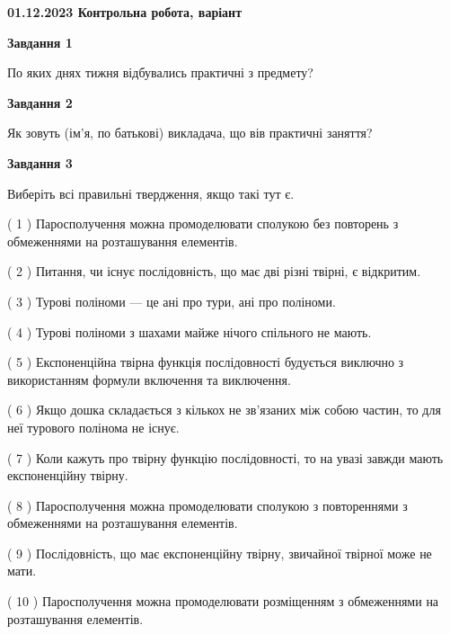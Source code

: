 \documentclass[12pt, ukrainian]{article}
\begin{document}
\begin {large}

\textbf{01.12.2023 Контрольна робота, варіант  }\par


{
{\begin {center}\textbf{Завдання 1}\end {center}}\par
По яких днях тижня відбувались практичні з предмету?\par
{\begin {center}\textbf{Завдання 2}\end {center}}\par
Як зовуть (ім'я, по батькові) викладача, що вів практичні заняття?\par
{\begin {center}\textbf{Завдання 3}\end {center}}\par
Виберіть всі правильні твердження, якщо такі тут є.\par
\vspace{2mm}
( 1 ) Паросполучення можна промоделювати сполукою без повторень з обмеженнями на розташування елементів.%

( 2 ) Питання, чи існує послідовність, що має дві різні твірні, є відкритим.%

( 3 ) Турові поліноми --- це ані про тури, ані про поліноми.%

( 4 ) Турові поліноми з шахами майже нічого спільного не мають.%

( 5 ) Експоненційна твірна функція послідовності будується виключно з використанням формули включення та виключення.%

( 6 ) Якщо дошка складається з кількох не зв’язаних між собою частин, то для неї турового полінома не існує.%

( 7 ) Коли кажуть про твірну функцію послідовності, то на увазі завжди мають експоненційну твірну.%

( 8 ) Паросполучення можна промоделювати сполукою з повтореннями з обмеженнями на розташування елементів.%

( 9 ) Послідовність, що має експоненційну твірну, звичайної твірної може не мати.%

( 10 ) Паросполучення можна промоделювати розміщенням з обмеженнями на розташування елементів.%
}
\end {large}

\vspace{4mm}
\newpage
\end{document}
